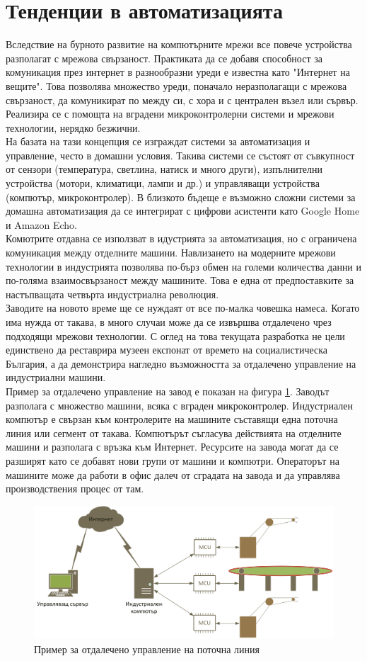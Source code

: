 \section{Тенденции в автоматизацията}
Вследствие на бурното развитие на компютърните мрежи все повече устройства разполагат с мрежова свързаност. Практиката да се добавя способност за комуникация през интернет в разнообразни уреди е известна като "Интернет на вещите". Това позволява множество уреди, поначало неразполагащи с мрежова свързаност, да комуникират по между си, с хора и с централен възел или сървър. Реализира се с помощта на вградени микроконтролерни системи и мрежови технологии, нерядко безжични.
\cite{IoT-def}\\
\indent{}
На базата на тази концепция се изграждат системи за автоматизация и управление, често в домашни условия. Такива системи се състоят от съвкупност от сензори (температура, светлина, натиск и много други), изпълнителни устройства (мотори, климатици, лампи и др.) и управляващи устройства (компютър, микроконтролер).
\cite{home-auto-def}
В близкото бъдеще е възможно сложни системи за домашна автоматизация да се интегрират с цифрови асистенти като Google Home и Amazon Echo.\\
\indent{}
Комютрите отдавна се използват в идустрията за автоматизация, но с ограничена комуникация между отделните машини. Навлизането на модерните мрежови технологии в индустрията позволява по-бърз обмен на големи количества данни и по-голяма взаимосвързаност между машините. Това е една от предпоставките за настъпващата четвърта индустриална революция.
\cite{industry-4.0}\\
\indent{}
Заводите на новото време ще се нуждаят от все по-малка човешка намеса. Когато има нужда от такава, в много случаи може да се извършва отдалечено чрез подходящи мрежови технологии. С оглед на това текущата разработка не цели единствено да реставрира музеен експонат от времето на социалистическа България, а да демонстрира нагледно възможността за отдалечено управление на индустриални машини.\\
\indent{}
Пример за отдалечено управление на завод е показан на фигура \ref{fig:example_use}. Заводът разполага с множество машини, всяка с вграден микроконтролер. Индустриален компютър е свързан към контролерите на машините съставящи една поточна линия или сегмент от такава. Компютърът съгласува действията на отделните машини и разполага с връзка към Интернет. Ресурсите на завода могат да се разширят като се добавят нови групи от машини и компютри. Операторът на машините може да работи в офис далеч от сградата на завода и да управлява производствения процес от там.
\begin{figure}[!htb]
    \centering
    \includegraphics[width=\linewidth]{pictures/ROBKO_example_use.png}
    \caption{Пример за отдалечено управление на поточна линия}
    \label{fig:example_use}
\end{figure}